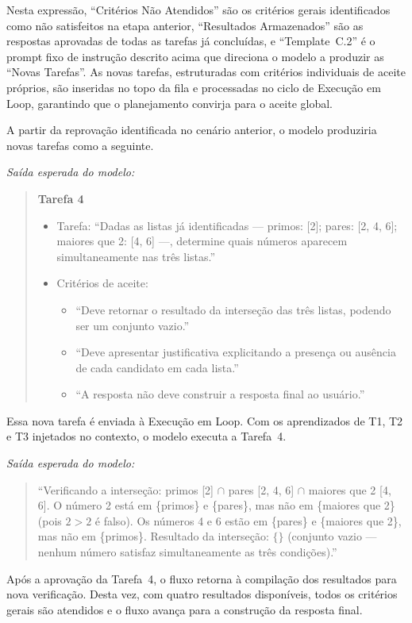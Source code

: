 \documentclass[a4paper,10pt,twocolumn]{article}
\newcommand{\saidaLLM}{%
  \smallskip\noindent\textit{Saída esperada do modelo:}\smallskip\par
}
\begin{document}
Nesta expressão, ``Critérios Não Atendidos'' são os critérios gerais identificados como não satisfeitos na etapa anterior, ``Resultados Armazenados'' são as respostas aprovadas de todas as tarefas já concluídas, e ``Template~C.2'' é o prompt fixo de instrução descrito acima que direciona o modelo a produzir as ``Novas Tarefas''. As novas tarefas, estruturadas com critérios individuais de aceite próprios, são inseridas no topo da fila e processadas no ciclo de Execução em Loop, garantindo que o planejamento convirja para o aceite global.

\begin{exemplo}
A partir da reprovação identificada no cenário anterior, o modelo produziria novas tarefas como a seguinte.

\saidaLLM

\begin{quote}
\textbf{Tarefa 4}
\begin{itemize}
  \item Tarefa: ``Dadas as listas já identificadas — primos: [2]; pares: [2, 4, 6]; maiores que 2: [4, 6] —, determine quais números aparecem simultaneamente nas três listas.''
  \item Critérios de aceite:
  \begin{itemize}
    \item ``Deve retornar o resultado da interseção das três listas, podendo ser um conjunto vazio.''
    \item ``Deve apresentar justificativa explicitando a presença ou ausência de cada candidato em cada lista.''
    \item ``A resposta não deve construir a resposta final ao usuário.''
  \end{itemize}
\end{itemize}
\end{quote}

Essa nova tarefa é enviada à Execução em Loop. Com os aprendizados de T1, T2 e T3 injetados no contexto, o modelo executa a Tarefa~4.

\saidaLLM

\begin{quote}
``Verificando a interseção: primos [2] $\cap$ pares [2, 4, 6] $\cap$ maiores que 2 [4, 6]. O número 2 está em \{primos\} e \{pares\}, mas não em \{maiores que 2\} (pois $2 > 2$ é falso). Os números 4 e 6 estão em \{pares\} e \{maiores que 2\}, mas não em \{primos\}. Resultado da interseção: $\{\}$ (conjunto vazio — nenhum número satisfaz simultaneamente as três condições).''
\end{quote}

Após a aprovação da Tarefa~4, o fluxo retorna à compilação dos resultados para nova verificação. Desta vez, com quatro resultados disponíveis, todos os critérios gerais são atendidos e o fluxo avança para a construção da resposta final.
\end{exemplo}
\end{document}
